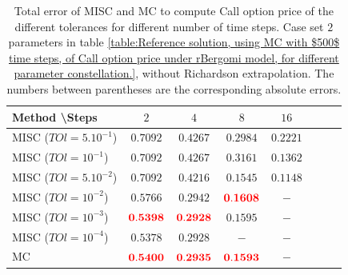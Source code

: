 \documentclass[11pt]{article}
\begin{document}
\begin{table}[h!]
	\centering
	\begin{tabular}{l*{6}{c}r}
		Method \textbackslash  Steps            & $2$ & $4$ & $8$ & $16$  \\
		\hline
		MISC ($TOl=5.10^{-1}$)  & $\mathbf{0.7092}$ & $\mathbf{0.4267}$ & $\mathbf{0.2984}$ & $\mathbf{ 0.2221}$  \\
		MISC ($TOl=10^{-1}$)  & $\mathbf{0.7092}$ & $\mathbf{0.4267}$ & $\mathbf{ 0.3161
}$ & $\mathbf{0.1362}$  \\
		MISC ($TOl=5.10^{-2}$)  &$\mathbf{0.7092}$ & $\mathbf{   0.4216
	}$ & $\mathbf{0.1545 }$ & $\mathbf{ 0.1148}$  \\
		MISC ($TOl=10^{-2}$)  & $\mathbf{ 0.5766}$ & $\mathbf{0.2942}$ & $\mathbf{ {\color{red}0.1608} }$ & $\mathbf{-}$  \\
	MISC ($TOl=10^{-3}$)        & $\mathbf{{\color{red}0.5398}}$  &  $\mathbf{{\color{red}0.2928}}$ &  $\mathbf{0.1595}$ &  $-$ \\
		MISC ($TOl=10^{-4}$)        & $\mathbf{0.5378}$  & $\mathbf{0.2928}$  &  $-$ &  $-$ \\
	\hline
	MC    & $\mathbf{{\color{red}0.5400}}$  & $\mathbf{{\color{red}0.2935}
	}$  &$\mathbf{{\color{red}
		0.1593}}$  & $\mathbf{-}$  \\	
%			
		\hline
	\end{tabular}
	\caption{Total error of MISC and MC to compute Call option price of the different tolerances for different number of time steps. Case  set $2$ parameters in table \ref{table:Reference solution, using MC with $500$ time steps, of Call option price under rBergomi model, for different parameter constellation.}, without Richardson extrapolation. The numbers between parentheses are the corresponding absolute errors.}
	\label{Total error of MISC and MC to compute Call option price of the different tolerances for different number of time steps. Case $K=1$, $H=0.07$, without Richardson extrapolation. The numbers between parentheses are the corresponding absolute errors.}
\end{table}
\end{document}

